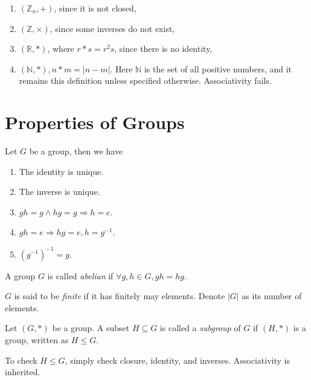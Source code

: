 \documentclass[10pt]{article}
\def\le{\leqslant}
\begin{document}
    \begin{example}
        \begin{enumerate}[(1)]
            \item $ (\mathbb{Z}_n, +) $, since it is not closed,
            \item $ (\mathbb{Z} , \times) $, since some inverses do not exist,
            \item $ (\mathbb{R} , *) $, where $ r*s = r^2 s $, since there is no identity,
            \item $ (\mathbb{N}, *), n*m = |n-m| $. Here $ \mathbb{N} $ is the set of all positive numbers, and it remains this definition unless specified otherwise. Associativity fails.
        \end{enumerate}
    \end{example}
    \section{Properties of Groups}
    \begin{proposition}\label{prop:groups_properties}
        Let $G$ be a group, then we have 
        \begin{enumerate}
            \item The identity is unique.
            \item The inverse is unique.
            \item $ gh=g \land hg=g \Rightarrow h=e $.
            \item $ gh=e \Rightarrow hg=e, h=g^{-1} $.
            \item $ (g^{-1})^{-1}=g $.
        \end{enumerate}
    \end{proposition}
    \begin{definition}
        A group $G$ is called \textit{abelian} if $ \forall g,h\in G, gh=hg $.
    \end{definition}
    \begin{definition}
        $G$ is said to be \textit{finite} if it has finitely may elements. Denote $|G|$ as its number of elements.
    \end{definition}
    \begin{definition}
        Let $ (G,*) $ be a group. A subset $H\subseteq G$ is called a \textit{subgroup} of $G$ if $ (H,*) $ is a group, written as $ H\le G $.
    \end{definition}
    \begin{remark}
        To check $ H\le G $, simply check closure, identity, and inverses. Associativity is inherited.
    \end{remark}
\end{document}
